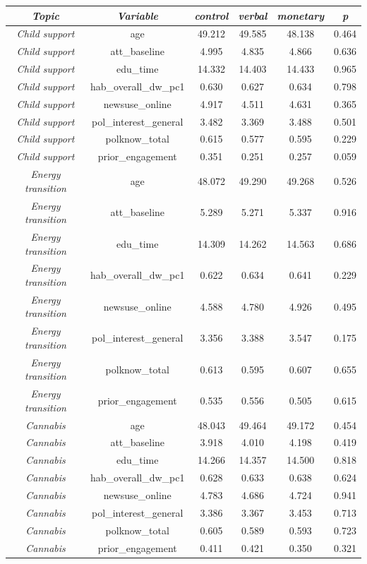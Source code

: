 \begin{tabular}{c c c c c c}
      \hline
      \textit{Topic} & \textit{Variable} & \textit{control} & \textit{verbal} & \textit{monetary} & \textit{p} \\
      \hline
      \textit{Child support} & age & 49.212 & 49.585 & 48.138 & 0.464 \\
      \textit{Child support} & att\_baseline & 4.995 & 4.835 & 4.866 & 0.636 \\
      \textit{Child support} & edu\_time & 14.332 & 14.403 & 14.433 & 0.965 \\
      \textit{Child support} & hab\_overall\_dw\_pc1 & 0.630 & 0.627 & 0.634 & 0.798 \\
      \textit{Child support} & newsuse\_online & 4.917 & 4.511 & 4.631 & 0.365 \\
      \textit{Child support} & pol\_interest\_general & 3.482 & 3.369 & 3.488 & 0.501 \\
      \textit{Child support} & polknow\_total & 0.615 & 0.577 & 0.595 & 0.229 \\
      \textit{Child support} & prior\_engagement & 0.351 & 0.251 & 0.257 & 0.059 \\
      \textit{Energy transition} & age & 48.072 & 49.290 & 49.268 & 0.526 \\
      \textit{Energy transition} & att\_baseline & 5.289 & 5.271 & 5.337 & 0.916 \\
      \textit{Energy transition} & edu\_time & 14.309 & 14.262 & 14.563 & 0.686 \\
      \textit{Energy transition} & hab\_overall\_dw\_pc1 & 0.622 & 0.634 & 0.641 & 0.229 \\
      \textit{Energy transition} & newsuse\_online & 4.588 & 4.780 & 4.926 & 0.495 \\
      \textit{Energy transition} & pol\_interest\_general & 3.356 & 3.388 & 3.547 & 0.175 \\
      \textit{Energy transition} & polknow\_total & 0.613 & 0.595 & 0.607 & 0.655 \\
      \textit{Energy transition} & prior\_engagement & 0.535 & 0.556 & 0.505 & 0.615 \\
      \textit{Cannabis} & age & 48.043 & 49.464 & 49.172 & 0.454 \\
      \textit{Cannabis} & att\_baseline & 3.918 & 4.010 & 4.198 & 0.419 \\
      \textit{Cannabis} & edu\_time & 14.266 & 14.357 & 14.500 & 0.818 \\
      \textit{Cannabis} & hab\_overall\_dw\_pc1 & 0.628 & 0.633 & 0.638 & 0.624 \\
      \textit{Cannabis} & newsuse\_online & 4.783 & 4.686 & 4.724 & 0.941 \\
      \textit{Cannabis} & pol\_interest\_general & 3.386 & 3.367 & 3.453 & 0.713 \\
      \textit{Cannabis} & polknow\_total & 0.605 & 0.589 & 0.593 & 0.723 \\
      \textit{Cannabis} & prior\_engagement & 0.411 & 0.421 & 0.350 & 0.321 \\
      \hline
    \end{tabular}
